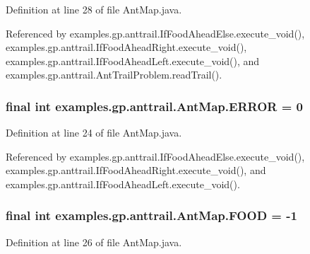 Definition at line 28 of file Ant\-Map.\-java.



Referenced by examples.\-gp.\-anttrail.\-If\-Food\-Ahead\-Else.\-execute\-\_\-void(), examples.\-gp.\-anttrail.\-If\-Food\-Ahead\-Right.\-execute\-\_\-void(), examples.\-gp.\-anttrail.\-If\-Food\-Ahead\-Left.\-execute\-\_\-void(), and examples.\-gp.\-anttrail.\-Ant\-Trail\-Problem.\-read\-Trail().

\hypertarget{classexamples_1_1gp_1_1anttrail_1_1_ant_map_af8255788ef3c81c9b6e31a5e1e2ff7a1}{
\subsubsection[{E\-R\-R\-O\-R}]{\setlength{\rightskip}{0pt plus 5cm}final int examples.\-gp.\-anttrail.\-Ant\-Map.\-E\-R\-R\-O\-R = 0\hspace{0.3cm}{\ttfamily [static]}}}\label{classexamples_1_1gp_1_1anttrail_1_1_ant_map_af8255788ef3c81c9b6e31a5e1e2ff7a1}


Definition at line 24 of file Ant\-Map.\-java.



Referenced by examples.\-gp.\-anttrail.\-If\-Food\-Ahead\-Else.\-execute\-\_\-void(), examples.\-gp.\-anttrail.\-If\-Food\-Ahead\-Right.\-execute\-\_\-void(), and examples.\-gp.\-anttrail.\-If\-Food\-Ahead\-Left.\-execute\-\_\-void().

\hypertarget{classexamples_1_1gp_1_1anttrail_1_1_ant_map_abc79aa51bbaa3882872e9c83b6596f09}{
\subsubsection[{F\-O\-O\-D}]{\setlength{\rightskip}{0pt plus 5cm}final int examples.\-gp.\-anttrail.\-Ant\-Map.\-F\-O\-O\-D = -\/1\hspace{0.3cm}{\ttfamily [static]}}}\label{classexamples_1_1gp_1_1anttrail_1_1_ant_map_abc79aa51bbaa3882872e9c83b6596f09}


Definition at line 26 of file Ant\-Map.\-java.




